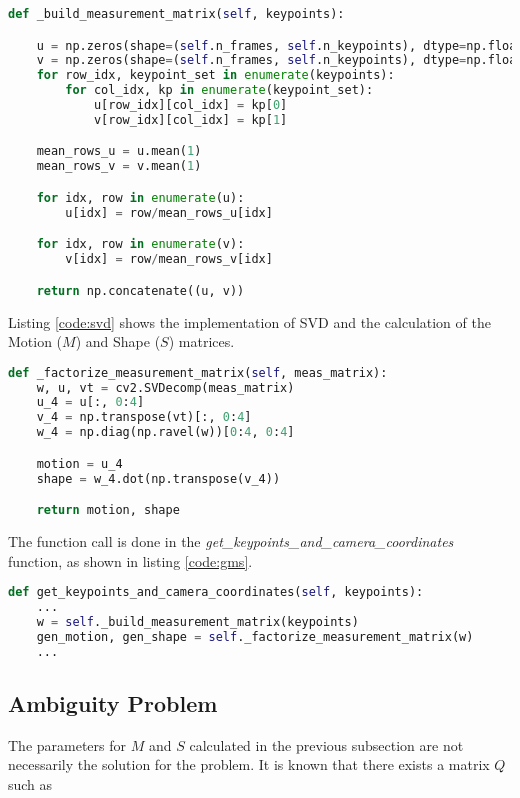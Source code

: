 \documentclass[]{IEEEtran}
\begin{document}
\begin{lstlisting}[language=Python, caption={P matrix construction.}, label={code:p-m}]
def _build_measurement_matrix(self, keypoints):

    u = np.zeros(shape=(self.n_frames, self.n_keypoints), dtype=np.float32)
    v = np.zeros(shape=(self.n_frames, self.n_keypoints), dtype=np.float32)
    for row_idx, keypoint_set in enumerate(keypoints):
        for col_idx, kp in enumerate(keypoint_set):
            u[row_idx][col_idx] = kp[0]
            v[row_idx][col_idx] = kp[1]

    mean_rows_u = u.mean(1)
    mean_rows_v = v.mean(1)

    for idx, row in enumerate(u):
        u[idx] = row/mean_rows_u[idx]

    for idx, row in enumerate(v):
        v[idx] = row/mean_rows_v[idx]

    return np.concatenate((u, v))
\end{lstlisting}

\par Listing \ref{code:svd} shows the implementation of SVD and the calculation of the Motion ($M$) and Shape ($S$) matrices.  

\begin{lstlisting}[language=Python, caption={System solving for M and S.}, label={code:svd}]
def _factorize_measurement_matrix(self, meas_matrix):
    w, u, vt = cv2.SVDecomp(meas_matrix)
    u_4 = u[:, 0:4]
    v_4 = np.transpose(vt)[:, 0:4]
    w_4 = np.diag(np.ravel(w))[0:4, 0:4]

    motion = u_4
    shape = w_4.dot(np.transpose(v_4))

    return motion, shape
\end{lstlisting}

The function call is done in the \textit{get\_keypoints\_and\_camera\_coordinates} function, as shown in listing \ref{code:gms}.

\begin{lstlisting}[language=Python, caption={Factorization call}, label={code:gms}]
def get_keypoints_and_camera_coordinates(self, keypoints):
    ...
    w = self._build_measurement_matrix(keypoints)
    gen_motion, gen_shape = self._factorize_measurement_matrix(w)
    ...
\end{lstlisting}

\subsection{Ambiguity Problem}
\label{subsec:ambi}
The parameters for $M$ and $S$ calculated in the previous subsection are not necessarily the solution for the problem. It is known that there exists a matrix $Q$ such as
\end{document}
